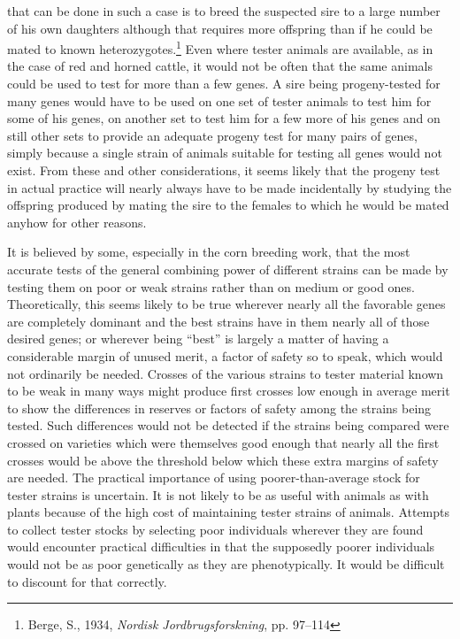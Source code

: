 that can be done in such a case is to breed the suspected sire to a large
number of his own daughters although that requires more offspring
than if he could be mated to known heterozygotes.\footnote{Berge, S.,
1934, \textit{Nordisk Jordbrugsforskning}, pp. 97--114} Even where tester
animals are available, as in the case of red and horned cattle, it would
not be often that the same animals could be used to test for more than a
few genes. A sire being progeny-tested for many genes would have to be
used on one set of tester animals to test him for some of his genes, on
another set to test him for a few more of his genes and on still other sets
to provide an adequate progeny test for many pairs of genes, simply
because a single strain of animals suitable for testing all genes would
not exist. From these and other considerations, it seems likely that the
progeny test in actual practice will nearly always have to be made incidentally
by studying the offspring produced by mating the sire to the
females to which he would be mated anyhow for other reasons.

It is believed by some, especially in the corn breeding work, that the
most accurate tests of the general combining power of different strains
can be made by testing them on poor or weak strains rather than on
medium or good ones. Theoretically, this seems likely to be true wherever
nearly all the favorable genes are completely dominant and the
best strains have in them nearly all of those desired genes; or wherever
being ``best'' is largely a matter of having a considerable margin of
unused merit, a factor of safety so to speak, which would not ordinarily
be needed. Crosses of the various strains to tester material known to be
weak in many ways might produce first crosses low enough in average
merit to show the differences in reserves or factors of safety among the
strains being tested. Such differences would not be detected if the
strains being compared were crossed on varieties which were themselves
good enough that nearly all the first crosses would be above the threshold
below which these extra margins of safety are needed. The practical
importance of using poorer-than-average stock for tester strains is uncertain.
It is not likely to be as useful with animals as with plants because
of the high cost of maintaining tester strains of animals. Attempts to
collect tester stocks by selecting poor individuals wherever they are
found would encounter practical difficulties in that the supposedly
poorer individuals would not be as poor genetically as they are phenotypically.
It would be difficult to discount for that correctly.

